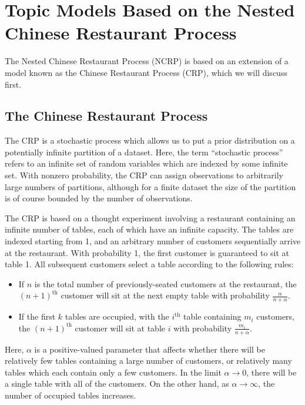 \documentclass{article}
\newcommand{\nth}{^{\text{th}}}
\begin{document}
\section{Topic Models Based on the Nested Chinese Restaurant Process}

The Nested Chinese Restaurant Process (NCRP) is based on an extension of a model known as the Chinese Restaurant Process (CRP), which we will discuss first.

\subsection{The Chinese Restaurant Process}

The CRP is a stochastic process which allows us to put a prior distribution on a potentially infinite partition of a dataset.
Here, the term ``stochastic process'' refers to an infinite set of random variables which are indexed by some infinite set.
With nonzero probability, the CRP can assign observations to arbitrarily large numbers of partitions, although for a finite dataset the size of the partition is of course bounded by the number of observations.

The CRP is based on a thought experiment involving a restaurant containing an infinite number of tables, each of which have an infinite capacity.
The tables are indexed starting from 1, and an arbitrary number of customers sequentially arrive at the restaurant.
With probability 1, the first customer is guaranteed to sit at table 1.
All subsequent customers select a table according to the following rules:
\begin{itemize}
\item If $n$ is the total number of previously-seated customers at the restaurant, the $(n+1)\nth$ customer will sit at the next empty table with probability $\frac{\alpha}{n + \alpha}$.
\item If the first $k$ tables are occupied, with the $i\nth$ table containing $m_i$ customers, the $(n+1)\nth$ customer will sit at table $i$ with probability $\frac{m_i}{n+\alpha}$.
\end{itemize}
Here, $\alpha$ is a positive-valued parameter that affects whether there will be relatively few tables containing a large number of customers, or relatively many tables which each contain only a few customers.
In the limit $\alpha \to 0$, there will be a single table with all of the customers.
On the other hand, as $\alpha \to \infty$, the number of occupied tables increases.
\end{document}
